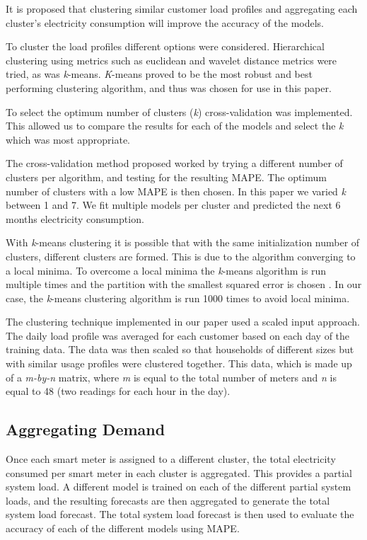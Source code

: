 It is proposed that clustering similar customer load profiles and aggregating each cluster's electricity consumption will improve the accuracy of the models. 

To cluster the load profiles different options were considered. Hierarchical clustering using metrics such as euclidean and wavelet distance metrics were tried, as was \textit{k}-means.\textit{ K}-means proved to be the most robust and best performing clustering algorithm, and thus was chosen for use in this paper.


To select the optimum number of clusters (\textit{k}) cross-validation was implemented. This allowed us to compare the results for each of the models and select the \textit{k} which was most appropriate.

The cross-validation method proposed worked by trying a different number of clusters per algorithm, and testing for the resulting MAPE. The optimum number of clusters with a low MAPE is then chosen. In this paper we varied \textit{k} between 1 and 7. We fit multiple models per cluster and predicted the next 6 months electricity consumption.

With \textit{k}-means clustering it is possible that with the same initialization number of clusters, different clusters are formed. This is due to the algorithm converging to a local minima. To overcome a local minima the \textit{k}-means algorithm is run multiple times and the partition with the smallest squared error is chosen \cite{Jain2010}. In our case, the \textit{k}-means clustering algorithm is run 1000 times to avoid local minima. 

The clustering technique implemented in our paper used a scaled input approach. The daily load profile was averaged for each customer based on each day of the training data. The data was then scaled so that households of different sizes but with similar usage profiles were clustered together. This data, which is made up of a \textit{m-by-n} matrix, where \textit{m} is equal to the total number of meters and \textit{n} is equal to 48 (two readings for each hour in the day).


\subsection{Aggregating Demand}

Once each smart meter is assigned to a different cluster, the total electricity consumed per smart meter in each cluster is aggregated. This provides a partial system load. A different model is trained on each of the different partial system loads, and the resulting forecasts are then aggregated to generate the total system load forecast. The total system load forecast is then used to evaluate the accuracy of each of the different models using MAPE. 

